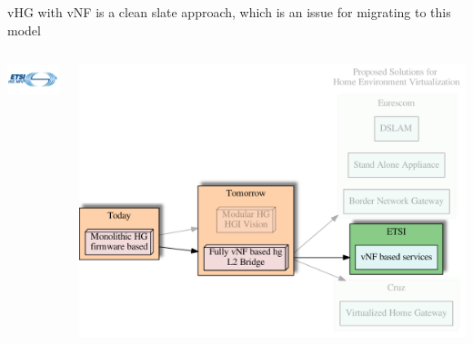 \documentclass[a4paper]{beamer}
\begin{document}
\begin{frame}{vHG with vNF is a clean slate approach, which is an issue for migrating to this model}
	\begin{columns}[T]
		\begin{column}[T]{0.33 \textwidth} 
			\vspace{6em}
			\includegraphics[width=10em]{etsinfv.png}
		\end{column}
										
		\begin{column}[T]{0.66\textwidth} 
										   
			\includegraphics[width=\textwidth]{vhgtrends-etsi-emphasis.pdf}
																																						
		\end{column}
																										
	\end{columns}
\end{frame}





\end{document}
